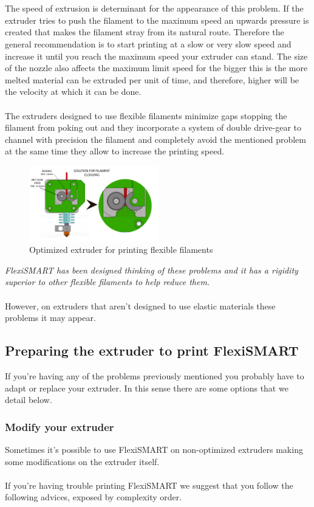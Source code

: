 \documentclass[11pt,a4paper]{article}
\begin{document}
\\\\
The speed of extrusion is determinant for the appearance of this problem. If the extruder tries to push the filament to the maximum speed an upwards pressure is created that makes the filament stray from its natural route. Therefore the general recommendation is to start printing at a slow or very slow speed and increase it until you reach the maximum speed your extruder can stand. The size of the nozzle also affects the maximum limit speed for the bigger this is the more melted material can be extruded per unit of time, and therefore, higher will be the velocity at which it can be done.
\\\\
The extruders designed to use flexible filaments minimize gaps stopping the filament from poking out and they incorporate a system of double drive-gear to channel with precision the filament and completely avoid the mentioned problem at the same time they allow to increase the printing speed.
\begin{figure}[H]
\centering
\includegraphics[width=0.5\textwidth,cfbox=azul_marcos 4pt 0pt]{FOTOS/NUDOS2}
\caption*{Optimized extruder for printing flexible filaments}
\end{figure}
\emph{FlexiSMART has been designed thinking of these problems and it has a rigidity superior to other flexible filaments to help reduce them.}
\\\\
However, on extruders that aren’t designed to use elastic materials these problems it may appear.
	\subsection{Preparing the extruder to print FlexiSMART}If you’re having any of the problems previously mentioned you probably have to adapt or replace your extruder. In this sense there are some options that we detail below.
		\subsubsection{Modify your extruder}
Sometimes it’s possible to use FlexiSMART on non-optimized extruders making some modifications on the extruder itself.
\\\\
If you’re having trouble printing FlexiSMART we suggest that you follow the following advices, exposed by complexity order.
\end{document}

